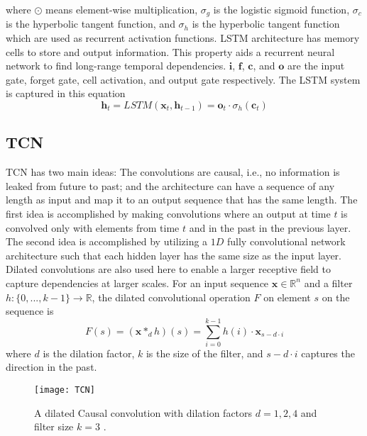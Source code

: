 \documentclass[12pt, A4]{article}
\begin{document}
where $\odot$ means element-wise multiplication, $\sigma_{g}$ is the logistic sigmoid function, $\sigma_{c}$ is the hyperbolic tangent function, and  $\sigma_{h}$ is the hyperbolic tangent function which are used as recurrent activation functions. LSTM architecture has memory cells to store and output information. This property aids a recurrent neural network to find long-range temporal dependencies. $\mathbf{i}$, $\mathbf{f}$, $\mathbf{c}$, and $\mathbf{o}$ are the input gate, forget gate, cell activation, and output gate respectively. The LSTM system is captured in this equation
\begin{equation}
	\mathbf{h}_{t} = LSTM(\mathbf{x}_{t}, \mathbf{h}_{t-1}) = \mathbf{o}_{t} \cdot \sigma_{h}(\mathbf{c}_{t})
\end{equation}

\subsection{TCN}
TCN has two main ideas: The convolutions are causal, i.e., no information is leaked from future to past; and the architecture can have a sequence of any length as input and map it to an output sequence that has the same length. The first idea is accomplished by making convolutions where an output at time $t$ is convolved only with elements from time $t$ and in the past in the previous layer. The second idea is accomplished by utilizing a $1D$ fully convolutional network architecture such that each hidden layer has the same size as the input layer. Dilated convolutions are also used here to enable a larger receptive field to capture dependencies at larger scales. For an input sequence $\mathbf{x} \in \mathbb{R}^{n}$ and a filter $h: \{0,...,k-1\} \rightarrow \mathbb{R}$, the dilated convolutional operation $F$ on element $s$ on the sequence is
\begin{equation}
	F(s) = (\mathbf{x} \ast_{d} h)(s) = \sum_{i=0}^{k-1}h(i)\cdot \mathbf{x}_{s-d\cdot i}
\end{equation}
where $d$ is the dilation factor, $k$ is the size of the filter, and $s-d\cdot i$ captures the direction in the past. \\

\begin{figure}[H]
	\centering
	\texttt{[image: TCN]}
	\caption{A dilated Causal convolution with dilation factors $d=1,2,4$ and filter size $k=3$ \cite{bai2018empirical}.}
	\label{TCN_arch}
\end{figure}
\end{document}
